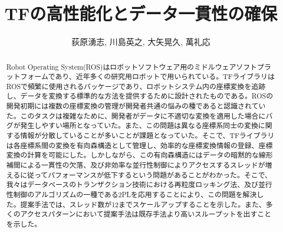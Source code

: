 \documentclass{jarticle}
\title{TFの高性能化とデータ一貫性の確保}
\author{荻原湧志, 川島英之, 大矢晃久, 萬礼応}
\date{}
\begin{document}
\makeatletter
\newenvironment{tablehere}{\def\@captype{tabel}}{} 
\newenvironment{figurehere}{\def\@captype{figure}}{} 
\makeatother

\maketitle 

\begin{abstract} %
Robot Operating System(ROS)はロボットソフトウェア用のミドルウェアソフトプラットフォームであり、近年多くの研究用ロボットで用いられている。TFライブラリはROSで頻繁に使用されるパッケージであり、ロボットシステム内の座標変換を追跡し、データを変換する標準的な方法を提供するために設計されたものである。ROSの開発初期には複数の座標変換の管理が開発者共通の悩みの種であると認識されていた。このタスクは複雑なために、開発者がデータに不適切な変換を適用した場合にバグが発生しやすい場所となっていた。また、この問題は異なる座標系同士の変換に関する情報が分散していることが多いことが課題となっていた。そこで、TFライブラリは各座標系間の変換を有向森構造として管理し、効率的な座標変換情報の登録、座標変換の計算を可能にした。しかしながら、この有向森構造にはデータの暗黙的な線形補間による一貫性の欠落、及び非効率な並行性制御によりアクセスするスレッドが増えるに従ってパフォーマンスが低下するという問題があることがわかった。そこで、我々はデータベースのトランザクション技術における再粒度ロッキング法、及び並行性制御のアルゴリズムの一種である2PLを応用することにより、この問題を解決した。提案手法では、スレッド数が12までスケールアップすることを示した。また、多くのアクセスパターンにおいて提案手法は既存手法より高いスループットを出すことを示した。
\newline	
\end{abstract}
\end{document}
